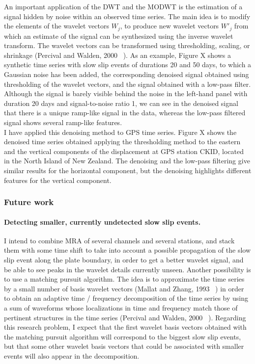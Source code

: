\documentclass[letterpaper, 12pt]{article}
\begin{document}
An important application of the DWT and the MODWT is the estimation of a signal hidden by noise within an observed time series. The main idea is to modify the elements of the wavelet vectors $W_j$, to produce new wavelet vectors $W'_j$ from which an estimate of the signal can be synthesized using the inverse wavelet transform. The wavelet vectors can be transformed using thresholding, scaling, or shrinkage (Percival and Walden, 2000 ~\cite{PER_2000}). As an example, Figure X shows a synthetic time series with slow slip events of durations 20 and 50 days, to which a Gaussian noise has been added, the corresponding denoised signal obtained using thresholding of the wavelet vectors, and the signal obtained with a low-pass filter. Although the signal is barely visible behind the noise in the left-hand panel with duration 20 days and signal-to-noise ratio 1, we can see in the denoised signal that there is a unique ramp-like signal in the data, whereas the low-pass filtered signal shows several ramp-like features. \\

I have applied this denoising method to GPS time series. Figure X shows the denoised time series obtained applying the thresholding method to the eastern and the vertical components of the displacement at GPS station CKID, located in the North Island of New Zealand. The denoising and the low-pass filtering give similar results for the horizontal component, but the denoising highlights different features for the vertical component.

\subsubsection*{Future work}

\paragraph{Detecting smaller, currently undetected slow slip events.} I intend to combine MRA of several channels and several stations, and stack them with some time shift to take into account a possible propagation of the slow slip event along the plate boundary, in order to get a better wavelet signal, and be able to see peaks in the wavelet details currently unseen. Another possibility is to use a matching pursuit algorithm. The idea is to approximate the time series by a small number of basis wavelet vectors (Mallat and Zhang, 1993 ~\cite{MAL_1993}) in order to obtain an adaptive time / frequency decomposition of the time series by using a sum of waveforms whose localizations in time and frequency match those of pertinent structures in the time series (Percival and Walden, 2000 ~\cite{PER_2000}). Regarding this research problem, I expect that the first wavelet basis vectors obtained with the matching pursuit algorithm will correspond to the biggest slow slip events, but that some other wavelet basis vectors that could be associated with smaller events will also appear in the decomposition.
\end{document}
